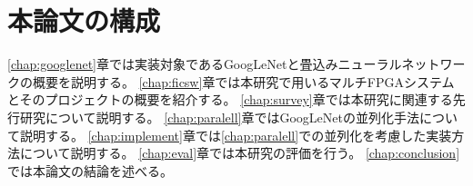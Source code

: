 {    \section{本論文の構成}
    \label{sec:composition}
    \ref{chap:googlenet}章では実装対象であるGoogLeNetと畳込みニューラルネットワークの概要を説明する。
    \ref{chap:ficsw}章では本研究で用いるマルチFPGAシステムとそのプロジェクトの概要を紹介する。
    \ref{chap:survey}章では本研究に関連する先行研究について説明する。
    \ref{chap:paralell}章ではGoogLeNetの並列化手法について説明する。
    \ref{chap:implement}章では\ref{chap:paralell}での並列化を考慮した実装方法について説明する。 
    \ref{chap:eval}章では本研究の評価を行う。 
    \ref{chap:conclusion}では本論文の結論を述べる。



}
